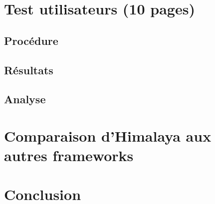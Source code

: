 
\chapter{Test utilisateurs (10 pages) }
	\section{Procédure}
	\section{Résultats}
	\section{Analyse}
\chapter{Comparaison d'Himalaya aux autres frameworks}
\chapter{Conclusion}

